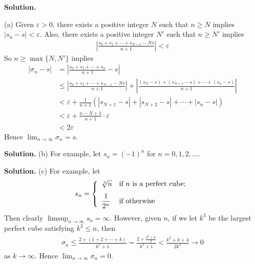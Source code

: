 \documentclass[12pt]{article}
\theoremstyle{definition}
\begin{document}
\smallskip
\noindent\textbf{Solution.}\quad

(a) Given $\varepsilon>0$, there exists a positive integer $N$ such that $n\ge N$ implies $\left\vert s_n-s\right\vert<\varepsilon$. Also, there exists a positive integer $N'$ such that $n\ge N'$ implies
\begin{align*}
\left\vert\frac{s_0+s_1+\cdots+s_{N-1}-Ns}{n+1}\right\vert<\varepsilon
\end{align*}
So $n\ge\max\{N,N'\}$ implies
\begin{align*}
\left\vert\sigma_n-s\right\vert
&=\left\vert\frac{s_0+s_1+\cdots+s_n}{n+1}-s\right\vert \\
&\le\left\vert\frac{s_0+s_1+\cdots+s_{N-1}-Ns}{n+1}\right\vert
+\left\vert\frac{(s_N-s)+(s_{N+1}-s)+\cdots+(s_n-s)}{n+1}\right\vert \\
&<\varepsilon
+\frac{1}{n+1}\left(\left\vert s_{N+1}-s\right\vert+\left\vert s_{N+2}-s\right\vert+\cdots+\left\vert s_n-s\right\vert\right) \\
&<\varepsilon+\frac{n-N+1}{n+1}\cdot\varepsilon \\
&<2\varepsilon
\end{align*}
Hence $\lim_{n\to\infty}\sigma_n=s$.

\smallskip
\noindent\textbf{Solution.}\quad
(b) For example, let $s_n=(-1)^n$ for $n=0,1,2,\ldots$.

\smallskip
\noindent\textbf{Solution.}\quad
(c) For example, let
\begin{align*}
s_n
=\left\{\begin{array}{ll}
\sqrt[3]{n}&\mbox{if $n$ is a perfect cube;}\vspace{0.1in}\\
\dfrac{1}{2^n}&\mbox{if otherwise}
\end{array}\right.
\end{align*}
Then clearly $\limsup_{n\to\infty}s_n=\infty$. However, given $n$, if we let $k^3$ be the largest perfect cube satisfying $k^3\le n$, then
\begin{align*}
\sigma_n
\le\frac{2+(1+2+\cdots+k)}{k^3+1}
=\frac{2+\frac{k^2+k}{2}}{k^3+1}
<\frac{k^2+k+4}{2k^3}
\to 0
\end{align*}
as $k\to\infty$. Hence $\lim_{n\to\infty}\sigma_n=0$.
\end{document}
